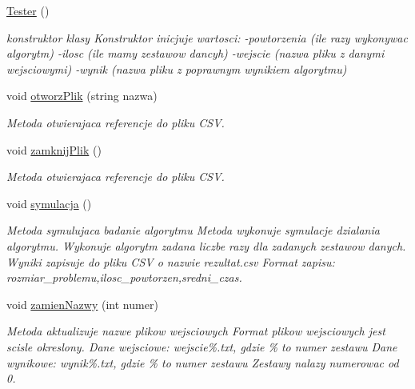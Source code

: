 \begin{DoxyCompactItemize}
\item 
\hypertarget{class_tester_ad70b2b2bbf6c564e710680ec1e0ae2d6}{\hyperlink{class_tester_ad70b2b2bbf6c564e710680ec1e0ae2d6}{Tester} ()}\label{class_tester_ad70b2b2bbf6c564e710680ec1e0ae2d6}

\begin{DoxyCompactList}\small\item\em konstruktor klasy Konstruktor inicjuje wartosci\-: -\/powtorzenia (ile razy wykonywac algorytm) -\/ilosc (ile mamy zestawow dancyh) -\/wejscie (nazwa pliku z danymi wejsciowymi) -\/wynik (nazwa pliku z poprawnym wynikiem algorytmu) \end{DoxyCompactList}\item 
\hypertarget{class_tester_af8058f14c6d5529157320b31a530b9f9}{void \hyperlink{class_tester_af8058f14c6d5529157320b31a530b9f9}{otworz\-Plik} (string nazwa)}\label{class_tester_af8058f14c6d5529157320b31a530b9f9}

\begin{DoxyCompactList}\small\item\em Metoda otwierajaca referencje do pliku C\-S\-V. \end{DoxyCompactList}\item 
\hypertarget{class_tester_aa6f8bb3a1049653cdeb9909f646d550f}{void \hyperlink{class_tester_aa6f8bb3a1049653cdeb9909f646d550f}{zamknij\-Plik} ()}\label{class_tester_aa6f8bb3a1049653cdeb9909f646d550f}

\begin{DoxyCompactList}\small\item\em Metoda otwierajaca referencje do pliku C\-S\-V. \end{DoxyCompactList}\item 
\hypertarget{class_tester_a0239bffc9d3bc51230e1c6d0e2ec39b4}{void \hyperlink{class_tester_a0239bffc9d3bc51230e1c6d0e2ec39b4}{symulacja} ()}\label{class_tester_a0239bffc9d3bc51230e1c6d0e2ec39b4}

\begin{DoxyCompactList}\small\item\em Metoda symulujaca badanie algorytmu Metoda wykonuje symulacje dzialania algorytmu. Wykonuje algorytm zadana liczbe razy dla zadanych zestawow danych. Wyniki zapisuje do pliku C\-S\-V o nazwie rezultat.\-csv Format zapisu\-: rozmiar\-\_\-problemu,ilosc\-\_\-powtorzen,sredni\-\_\-czas. \end{DoxyCompactList}\item 
void \hyperlink{class_tester_aa208dd32e74e6aef23683b8de4282295}{zamien\-Nazwy} (int numer)
\begin{DoxyCompactList}\small\item\em Metoda aktualizuje nazwe plikow wejsciowych Format plikow wejsciowych jest scisle okreslony. Dane wejsciowe\-: wejscie\%.txt, gdzie \% to numer zestawu Dane wynikowe\-: wynik\%.txt, gdzie \% to numer zestawu Zestawy nalazy numerowac od 0. \end{DoxyCompactList}\end{DoxyCompactItemize}


